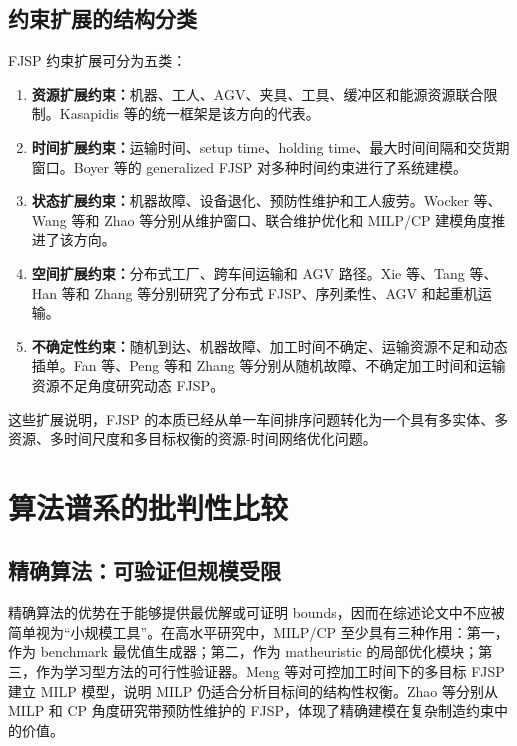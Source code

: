 \documentclass[UTF8,a4paper,11pt]{ctexart}
\begin{document}
\subsection{约束扩展的结构分类}

FJSP 约束扩展可分为五类：
\begin{enumerate}
    \item \textbf{资源扩展约束：}机器、工人、AGV、夹具、工具、缓冲区和能源资源联合限制。Kasapidis 等的统一框架是该方向的代表\cite{Kasapidis2025Unified}。
    \item \textbf{时间扩展约束：}运输时间、setup time、holding time、最大时间间隔和交货期窗口。Boyer 等的 generalized FJSP 对多种时间约束进行了系统建模\cite{Boyer2021GFJSP}。
    \item \textbf{状态扩展约束：}机器故障、设备退化、预防性维护和工人疲劳。Wocker 等、Wang 等和 Zhao 等分别从维护窗口、联合维护优化和 MILP/CP 建模角度推进了该方向\cite{Wocker2024PM,Wang2024PM,Zhao2025MILPPM,Zhao2025CPPM}。
    \item \textbf{空间扩展约束：}分布式工厂、跨车间运输和 AGV 路径。Xie 等、Tang 等、Han 等和 Zhang 等分别研究了分布式 FJSP、序列柔性、AGV 和起重机运输\cite{Xie2023HGTS,Tang2024DFJSP,Han2024AGV,Zhang2023CraneQL}。
    \item \textbf{不确定性约束：}随机到达、机器故障、加工时间不确定、运输资源不足和动态插单。Fan 等、Peng 等和 Zhang 等分别从随机故障、不确定加工时间和运输资源不足角度研究动态 FJSP\cite{Fan2024Breakdown,Peng2025Uncertain,Zhang2023InsufficientTR}。
\end{enumerate}

这些扩展说明，FJSP 的本质已经从单一车间排序问题转化为一个具有多实体、多资源、多时间尺度和多目标权衡的资源-时间网络优化问题。

\section{算法谱系的批判性比较}

\subsection{精确算法：可验证但规模受限}

精确算法的优势在于能够提供最优解或可证明 bounds，因而在综述论文中不应被简单视为“小规模工具”。在高水平研究中，MILP/CP 至少具有三种作用：第一，作为 benchmark 最优值生成器；第二，作为 matheuristic 的局部优化模块；第三，作为学习型方法的可行性验证器。Meng 等对可控加工时间下的多目标 FJSP 建立 MILP 模型，说明 MILP 仍适合分析目标间的结构性权衡\cite{Meng2023CPT}。Zhao 等分别从 MILP 和 CP 角度研究带预防性维护的 FJSP，体现了精确建模在复杂制造约束中的价值\cite{Zhao2025MILPPM,Zhao2025CPPM}。
\end{document}
